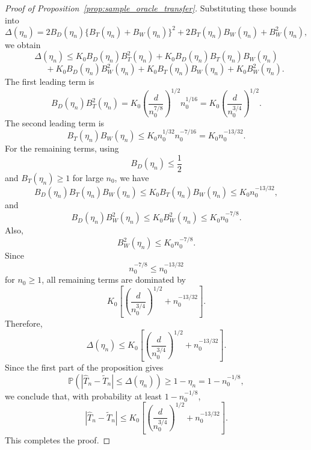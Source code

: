 \documentclass[
  12pt]{article}
\theoremstyle{plain}
\theoremstyle{definition}
\theoremstyle{remark}
\begin{document}
\begin{proof}[Proof of Proposition~\ref{prop:sample_oracle_transfer}]
Substituting these bounds into
\[
\Delta(\eta_n)
=
2B_D(\eta_n)\{B_T(\eta_n)+B_W(\eta_n)\}^2
+
2B_T(\eta_n)B_W(\eta_n)
+
B_W^2(\eta_n),
\]
we obtain
\[
\Delta(\eta_n)
\le
K_0 B_D(\eta_n)B_T^2(\eta_n)
+
K_0 B_D(\eta_n)B_T(\eta_n)B_W(\eta_n)
\]
\[
\qquad
+
K_0 B_D(\eta_n)B_W^2(\eta_n)
+
K_0 B_T(\eta_n)B_W(\eta_n)
+
K_0 B_W^2(\eta_n).
\]
The first leading term is
\[
B_D(\eta_n)B_T^2(\eta_n)
=
K_0
\left(
\frac{d}{n_0^{7/8}}
\right)^{1/2}
n_0^{1/16}
=
K_0
\left(
\frac{d}{n_0^{3/4}}
\right)^{1/2}.
\]
The second leading term is
\[
B_T(\eta_n)B_W(\eta_n)
\le
K_0 n_0^{1/32}n_0^{-7/16}
=
K_0 n_0^{-13/32}.
\]
For the remaining terms, using
\[
B_D(\eta_n)\le \frac12
\]
and \(B_T(\eta_n)\ge 1\) for large \(n_0\), we have
\[
B_D(\eta_n)B_T(\eta_n)B_W(\eta_n)
\le
K_0 B_T(\eta_n)B_W(\eta_n)
\le
K_0 n_0^{-13/32},
\]
and
\[
B_D(\eta_n)B_W^2(\eta_n)
\le
K_0 B_W^2(\eta_n)
\le
K_0 n_0^{-7/8}.
\]
Also,
\[
B_W^2(\eta_n)\le K_0 n_0^{-7/8}.
\]
Since
\[
n_0^{-7/8}\le n_0^{-13/32}
\]
for \(n_0\ge1\), all remaining terms are dominated by
\[
K_0
\left[
\left(
\frac{d}{n_0^{3/4}}
\right)^{1/2}
+
n_0^{-13/32}
\right].
\]
Therefore,
\[
\Delta(\eta_n)
\le
K_0
\left[
\left(
\frac{d}{n_0^{3/4}}
\right)^{1/2}
+
n_0^{-13/32}
\right].
\]
Since the first part of the proposition gives
\[
\mathbb P
\left(
|\widehat T_n-\widetilde T_n|
\le
\Delta(\eta_n)
\right)
\ge
1-\eta_n
=
1-n_0^{-1/8},
\]
we conclude that, with probability at least \(1-n_0^{-1/8}\),
\[
|\widehat T_n-\widetilde T_n|
\le
K_0
\left[
\left(
\frac{d}{n_0^{3/4}}
\right)^{1/2}
+
n_0^{-13/32}
\right].
\]
This completes the proof.
\end{proof}
\end{document}
